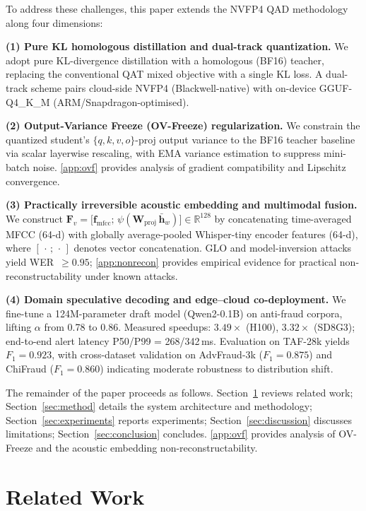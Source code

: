 \documentclass[final,5p,times,number]{elsarticle}
\begin{document}
To address these challenges, this paper extends the NVFP4 QAD methodology along four dimensions:

\textbf{(1) Pure KL homologous distillation and dual-track quantization.} We adopt pure KL-divergence distillation with a homologous (BF16) teacher, replacing the conventional QAT mixed objective with a single KL loss. A dual-track scheme pairs cloud-side NVFP4 (Blackwell-native) with on-device GGUF-Q4\_K\_M (ARM/Snapdragon-optimised).

\textbf{(2) Output-Variance Freeze (OV-Freeze) regularization.} We constrain the quantized student's $\{q,k,v,o\}$-proj output variance to the BF16 teacher baseline via scalar layerwise rescaling, with EMA variance estimation to suppress mini-batch noise. \ref{app:ovf} provides analysis of gradient compatibility and Lipschitz convergence.

\textbf{(3) Practically irreversible acoustic embedding and multimodal fusion.} We construct $\bm{F}_v = \bigl[\bm{f}_{\mathrm{mfcc}};\,\psi(\bm{W}_{\mathrm{proj}}\,\bar{\bm{h}}_w)\bigr] \in \mathbb{R}^{128}$ by concatenating time-averaged MFCC (64-d) with globally average-pooled Whisper-tiny encoder features (64-d), where $[\,\cdot\,;\,\cdot\,]$ denotes vector concatenation. GLO and model-inversion attacks yield WER~$\ge 0.95$; \ref{app:nonrecon} provides empirical evidence for practical non-reconstructability under known attacks.

\textbf{(4) Domain speculative decoding and edge--cloud co-deployment.} We fine-tune a 124M-parameter draft model (Qwen2-0.1B) on anti-fraud corpora, lifting $\alpha$ from 0.78 to 0.86. Measured speedups: $3.49\times$ (H100), $3.32\times$ (SD8G3); end-to-end alert latency P50/P99 = 268/342\,ms. Evaluation on TAF-28k yields $F_1 = 0.923$, with cross-dataset validation on AdvFraud-3k ($F_1 = 0.875$) and ChiFraud ($F_1 = 0.860$) indicating moderate robustness to distribution shift.

The remainder of the paper proceeds as follows. Section~\ref{sec:related} reviews related work; Section~\ref{sec:method} details the system architecture and methodology; Section~\ref{sec:experiments} reports experiments; Section~\ref{sec:discussion} discusses limitations; Section~\ref{sec:conclusion} concludes. \ref{app:ovf} provides analysis of OV-Freeze and the acoustic embedding non-reconstructability.

\section{Related Work}\label{sec:related}
\end{document}

